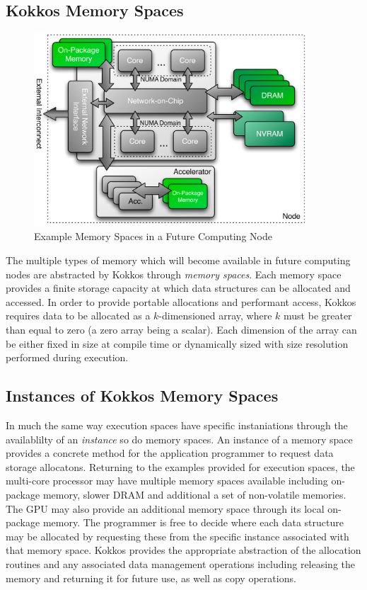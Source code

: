 \subsection{Kokkos Memory Spaces}

\begin{figure}
\begin{center}
\includegraphics[width=4in]{figures/kokkos-memory-space.pdf}
\caption{Example Memory Spaces in a Future Computing Node}
\label{fig:kokkos_memory_spaces}
\end{center}
\end{figure}

The multiple types of memory which will become available in future
computing nodes are abstracted by Kokkos through {\em memory
spaces}. Each memory space provides a finite storage capacity
at which data structures can be allocated and accessed. In
order to provide portable allocations and performant access,
Kokkos requires data to be allocated as a $k$-dimensioned array,
where $k$ must be greater than equal to zero (a zero array being
a scalar). Each dimension of the array can be either fixed in
size at compile time or dynamically sized with size resolution
performed during execution.

\subsection{Instances of Kokkos Memory Spaces}

In much the same way execution spaces have specific instaniations through
the availablilty of an {\em instance} so do memory spaces. An instance
of a memory space provides a concrete method for the
application programmer to request data storage allocatons. Returning
to the examples provided for execution spaces, the multi-core
processor may have multiple memory spaces available including
on-package memory, slower DRAM and additional a set of non-volatile
memories. The GPU may also provide an additional memory space
through its local on-package memory. The programmer is free
to decide where each data structure may be allocated by requesting
these from the specific instance associated with that memory space.
Kokkos provides the appropriate abstraction of the allocation
routines and any associated data management operations including
releasing the memory and returning it for future use, as well as
copy operations.

